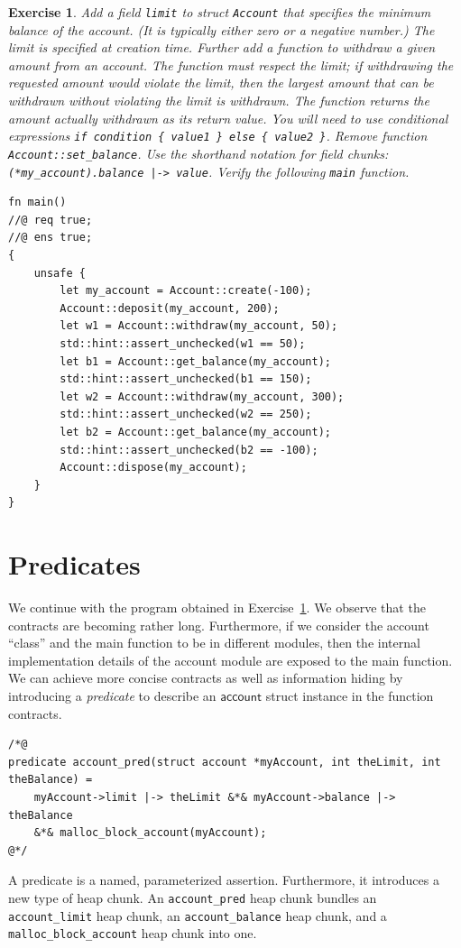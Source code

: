 \documentclass{article}
\newtheorem{exercise}{Exercise}
\begin{document}
\begin{exercise}\label{exercise:limit}
Add a field \lstinline!limit! to struct \lstinline!Account! that specifies the minimum balance of the account. (It is typically either zero or a negative number.)
The limit is specified at creation time. Further add a function
to withdraw a given amount from an account. The function must
respect the limit; if withdrawing the requested amount would violate the limit, then the largest amount that can be withdrawn without violating the limit is withdrawn. The function
returns the amount actually withdrawn as its return value. You
will need to use conditional expressions
\lstinline!if condition { value1 } else { value2 }!. Remove function
\lstinline!Account::set_balance!. Use the shorthand notation for
field chunks: \lstinline!(*my_account).balance |-> value!. Verify
the following \lstinline!main! function.
\begin{lstlisting}[basicstyle=\ttfamily\upshape]
fn main()
//@ req true;
//@ ens true;
{
    unsafe {
        let my_account = Account::create(-100);
        Account::deposit(my_account, 200);
        let w1 = Account::withdraw(my_account, 50);
        std::hint::assert_unchecked(w1 == 50);
        let b1 = Account::get_balance(my_account);
        std::hint::assert_unchecked(b1 == 150);
        let w2 = Account::withdraw(my_account, 300);
        std::hint::assert_unchecked(w2 == 250);
        let b2 = Account::get_balance(my_account);
        std::hint::assert_unchecked(b2 == -100);
        Account::dispose(my_account);
    }
}
\end{lstlisting}
\end{exercise}

\section{Predicates}

We continue with the program obtained in
Exercise~\ref{exercise:limit}. We observe that the contracts
are becoming rather long. Furthermore, if we consider the
account ``class'' and the main function to be in different
modules, then the internal implementation details of the
account module are exposed to the main function. We can achieve
more concise contracts as well as information hiding by
introducing a \emph{predicate} to describe an
$\mathsf{account}$ struct instance in the function contracts.
\begin{lstlisting}
/*@
predicate account_pred(struct account *myAccount, int theLimit, int theBalance) =
    myAccount->limit |-> theLimit &*& myAccount->balance |-> theBalance
    &*& malloc_block_account(myAccount);
@*/
\end{lstlisting}
A predicate is a named, parameterized assertion. Furthermore, it introduces a new type of heap chunk.
An \lstinline!account_pred! heap chunk bundles an \lstinline!account_limit! heap chunk, an \lstinline!account_balance! heap chunk,
and a \lstinline!malloc_block_account! heap chunk into one.
\end{document}
